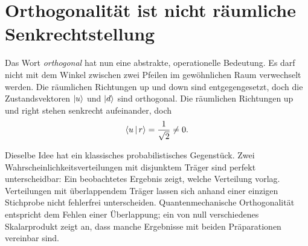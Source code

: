 \begin{classroomqa}
\end{classroomqa}

\section{Orthogonalität ist nicht räumliche Senkrechtstellung}

Das Wort \emph{orthogonal} hat nun eine abstrakte, operationelle Bedeutung. Es darf nicht mit dem Winkel zwischen zwei Pfeilen im gewöhnlichen Raum verwechselt werden. Die räumlichen Richtungen up und down sind entgegengesetzt, doch die Zustandsvektoren \(\left\lvert u\right\rangle\) und \(\left\lvert d\right\rangle\) sind orthogonal. Die räumlichen Richtungen up und right stehen senkrecht aufeinander, doch
\begin{equation}
\left\langle u\,\middle|\,r\right\rangle=\frac1{\sqrt2}\ne0.
\end{equation}

\begin{classroomqa}
\end{classroomqa}

Dieselbe Idee hat ein klassisches probabilistisches Gegenstück. Zwei Wahrscheinlichkeitsverteilungen mit disjunktem Träger sind perfekt unterscheidbar: Ein beobachtetes Ergebnis zeigt, welche Verteilung vorlag. Verteilungen mit überlappendem Träger lassen sich anhand einer einzigen Stichprobe nicht fehlerfrei unterscheiden. Quantenmechanische Orthogonalität entspricht dem Fehlen einer Überlappung; ein von null verschiedenes Skalarprodukt zeigt an, dass manche Ergebnisse mit beiden Präparationen vereinbar sind.

